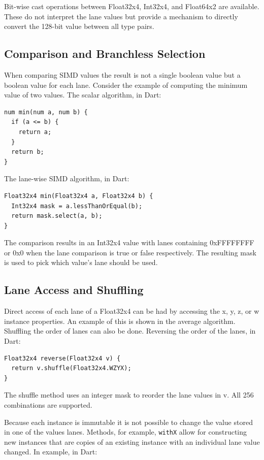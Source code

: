 \documentclass[preprint]{sigplanconf}
\begin{document}
Bit-wise cast operations between Float32x4, Int32x4, and Float64x2 are available. These do not interpret the lane values but provide a mechanism to directly convert the 128-bit value between all type pairs. 

\subsection{Comparison and Branchless Selection}
When comparing SIMD values the result is not a single boolean value but a boolean value for each lane. Consider the example of computing the minimum value of two values. The scalar algorithm, in Dart:
\begin{verbatim}
num min(num a, num b) {
  if (a <= b) {
    return a;
  }
  return b;
}
\end{verbatim}

The lane-wise SIMD algorithm, in Dart:

\begin{verbatim}
Float32x4 min(Float32x4 a, Float32x4 b) {
  Int32x4 mask = a.lessThanOrEqual(b);
  return mask.select(a, b);
}
\end{verbatim}

The comparison results in an Int32x4 value with lanes containing 0xFFFFFFFF or 0x0 when the lane comparison is true or false respectively. The resulting mask is used to pick which value's lane should be used. 

\subsection{Lane Access and Shuffling}
Direct access of each lane of a Float32x4 can be had by accessing the x, y, z, or w instance properties. An example of this is shown in the average algorithm. Shuffling the order of lanes can also be done. Reversing the order of the lanes, in Dart:
\begin{verbatim}
Float32x4 reverse(Float32x4 v) {
  return v.shuffle(Float32x4.WZYX);
}
\end{verbatim}

The shuffle method uses an integer mask to reorder the lane values in v. All 256 combinations are supported.

Because each instance is immutable it is not possible to change the value stored in one of the values lanes. Methods, for example, \verb!withX! allow for constructing new instances that are copies of an existing instance with an individual lane value changed. In example, in Dart:
\end{document}
